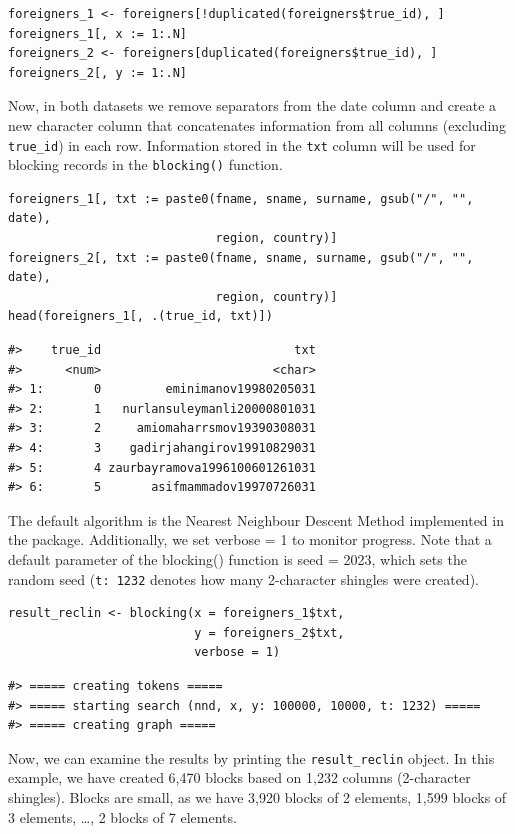 \begin{verbatim}
foreigners_1 <- foreigners[!duplicated(foreigners$true_id), ]
foreigners_1[, x := 1:.N]
foreigners_2 <- foreigners[duplicated(foreigners$true_id), ]
foreigners_2[, y := 1:.N]
\end{verbatim}

Now, in both datasets we remove separators from the date column and
create a new character column that concatenates information from all
columns (excluding \texttt{true\_id}) in each row. Information stored in the
\texttt{txt} column will be used for blocking records in the \texttt{blocking()}
function.

\begin{verbatim}
foreigners_1[, txt := paste0(fname, sname, surname, gsub("/", "", date), 
                             region, country)]
foreigners_2[, txt := paste0(fname, sname, surname, gsub("/", "", date), 
                             region, country)]
head(foreigners_1[, .(true_id, txt)])
\end{verbatim}

\begin{verbatim}
#>    true_id                           txt
#>      <num>                        <char>
#> 1:       0         eminimanov19980205031
#> 2:       1   nurlansuleymanli20000801031
#> 3:       2     amiomaharrsmov19390308031
#> 4:       3    gadirjahangirov19910829031
#> 5:       4 zaurbayramova1996100601261031
#> 6:       5       asifmammadov19970726031
\end{verbatim}

The default algorithm is the Nearest Neighbour Descent Method
\citep{Dong2011} implemented in the  package.
Additionally, we set verbose = 1 to monitor progress. Note that a
default parameter of the blocking() function is seed = 2023, which sets
the random seed (\texttt{t:\ 1232} denotes how many 2-character shingles were
created).

\begin{verbatim}
result_reclin <- blocking(x = foreigners_1$txt,
                          y = foreigners_2$txt,
                          verbose = 1)
\end{verbatim}

\begin{verbatim}
#> ===== creating tokens =====
#> ===== starting search (nnd, x, y: 100000, 10000, t: 1232) =====
#> ===== creating graph =====
\end{verbatim}

Now, we can examine the results by printing the \texttt{result\_reclin} object.
In this example, we have created
6,470
blocks based on 1,232
columns (2-character shingles). Blocks are small, as we have
3,920 blocks of 2
elements, 1,599 blocks of
3 elements, \ldots,
2 blocks of
7 elements.

